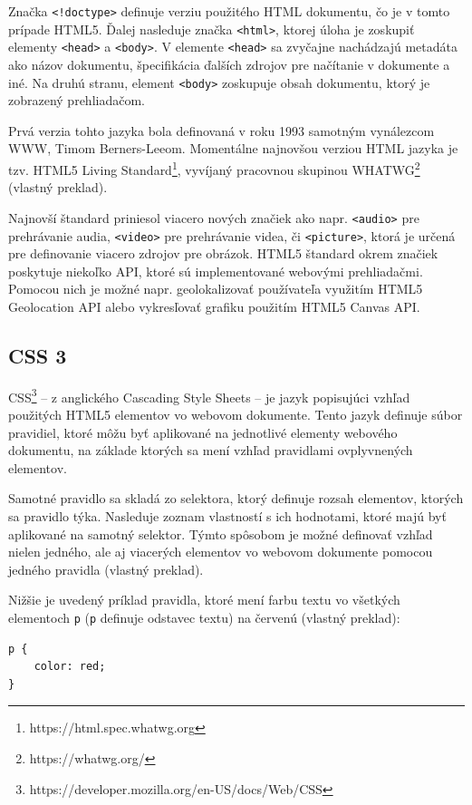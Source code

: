 Značka \texttt{<!doctype>} definuje verziu použitého HTML dokumentu, čo je v tomto prípade HTML5. Ďalej nasleduje značka \texttt{<html>}, ktorej úloha je zoskupiť elementy \texttt{<head>} a \texttt{<body>}. V elemente \texttt{<head>} sa zvyčajne nachádzajú metadáta ako názov dokumentu, špecifikácia ďalších zdrojov pre načítanie v dokumente a iné. Na druhú stranu, element \texttt{<body>} zoskupuje obsah dokumentu, ktorý je zobrazený prehliadačom.

Prvá verzia tohto jazyka bola definovaná v roku 1993 samotným vynálezcom WWW, Timom Berners-Leeom. Momentálne najnovšou verziou HTML jazyka je tzv. HTML5 Living Standard\footnote{https://html.spec.whatwg.org}, vyvíjaný pracovnou skupinou WHATWG\footnote{https://whatwg.org/} \cite{html_standard} (vlastný preklad).

Najnovší štandard priniesol viacero nových značiek ako napr. \texttt{<audio>} pre prehrávanie audia, \texttt{<video>} pre prehrávanie videa, či \texttt{<picture>}, ktorá je určená pre definovanie viacero zdrojov pre obrázok. HTML5 štandard okrem značiek poskytuje niekoľko API, ktoré sú implementované webovými prehliadačmi. Pomocou nich je možné napr. geolokalizovať používateľa využitím HTML5 Geolocation API alebo vykresľovať grafiku použitím HTML5 Canvas API.

\subsection {CSS 3}
CSS\footnote{https://developer.mozilla.org/en-US/docs/Web/CSS} -- z anglického Cascading Style Sheets -- je jazyk popisujúci vzhľad použitých HTML5 elementov vo webovom dokumente. Tento jazyk definuje súbor pravidiel, ktoré môžu byť aplikované na jednotlivé elementy webového dokumentu, na základe ktorých sa mení vzhľad pravidlami ovplyvnených elementov.

Samotné pravidlo sa skladá zo selektora, ktorý definuje rozsah elementov, ktorých sa pravidlo týka. Nasleduje zoznam vlastností s ich hodnotami, ktoré majú byť aplikované na samotný selektor. Týmto spôsobom je možné definovať vzhľad nielen jedného, ale aj viacerých elementov vo webovom dokumente pomocou jedného pravidla \cite{css_basics} (vlastný preklad).

Nižšie je uvedený príklad pravidla, ktoré mení farbu textu vo všetkých elementoch \texttt{p} (\texttt{p} definuje odstavec textu) na červenú \cite{css_basics} (vlastný preklad):

\begin{minipage}[]{\linewidth}
\begin{verbatim}
p {
    color: red;
}
\end{verbatim}
\end{minipage}


